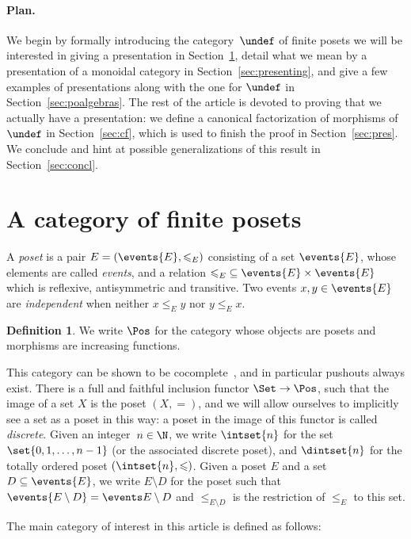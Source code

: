 \documentclass[submission,copyright,creativecommons]{eptcs}
\let\P\undef
\theoremstyle{definition}
\newtheorem{definition}[theorem]{Definition}
\theoremstyle{remark}
\renewcommand{\leq}{\leqslant}
\begin{document}
\paragraph{Plan.}
We begin by formally introducing the category~$\P$ of finite posets we will be
interested in giving a presentation in Section~\ref{sec:finpos}, detail what we
mean by a presentation of a monoidal category in Section~\ref{sec:presenting},
and give a few examples of presentations along with the one for $\P$ in
Section~\ref{sec:poalgebras}. The rest of the article is devoted to proving that
we actually have a presentation: we define a canonical factorization of
morphisms of $\P$ in Section~\ref{sec:cf}, which is used to finish the proof in
Section~\ref{sec:pres}. We conclude and hint at possible generalizations of this
result in Section~\ref{sec:concl}.


\section{A category of finite posets}
\label{sec:finpos}
A \emph{poset} is a pair $E=(\events{E},\leq_E)$ consisting of a set
$\events{E}$, whose elements are called \emph{events}, and a relation
${\leq_E}\subseteq\events{E}\times\events{E}$ which is reflexive, antisymmetric
and transitive. Two events $x,y\in\events{E}$ are \emph{independent} when
neither $x\leq_E y$ nor $y\leq_E x$.

\begin{definition}
  We write $\Pos$ for the category whose objects are posets and morphisms are
  increasing functions.
\end{definition}

\noindent
This category can be shown to be cocomplete~\cite{adamek1994locally}, and in
particular pushouts always exist. There is a full and faithful inclusion functor
$\Set\to\Pos$, such that the image of a set $X$ is the poset $(X,=)$, and we
will allow ourselves to implicitly see a set as a poset in this way: a poset in
the image of this functor is called \emph{discrete}. Given an integer~$n\in\N$,
we write $\intset{n}$ for the set $\set{0,1,\ldots,n-1}$ (or the associated
discrete poset), and $\dintset{n}$ for the totally ordered poset
$(\intset{n},\leq)$. Given a poset $E$ and a set $D\subseteq\events{E}$, we
write $E\setminus D$ for the poset such that $\events{E\setminus D}=\events
E\setminus D$ and $\leq_{E\setminus D}$ is the restriction of $\leq_E$ to this
set.

The main category of interest in this article is defined as follows:
\end{document}
